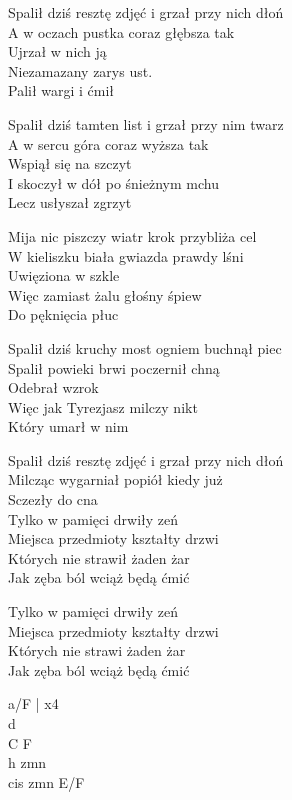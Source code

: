 \begin{text}
    Spalił dziś resztę zdjęć i grzał przy nich dłoń\\
    A w oczach pustka coraz głębsza tak\\
    Ujrzał w nich ją\\
    Niezamazany zarys ust.\\
    Palił wargi i ćmił

    Spalił dziś tamten list i grzał przy nim twarz\\
    A w sercu góra coraz wyższa tak\\
    Wspiął się na szczyt\\
    I skoczył w dół po śnieżnym mchu\\
    Lecz usłyszał zgrzyt

    Mija nic piszczy wiatr krok przybliża cel\\
    W kieliszku biała gwiazda prawdy lśni\\
    Uwięziona w szkle\\
    Więc zamiast żalu głośny śpiew\\
    Do pęknięcia płuc

    Spalił dziś kruchy most ogniem buchnął piec\\
    Spalił powieki brwi poczernił chną\\
    Odebrał wzrok\\
    Więc jak Tyrezjasz milczy nikt\\
    Który umarł w nim

    Spalił dziś resztę zdjęć i grzał przy nich dłoń\\
    Milcząc wygarniał popiół kiedy już\\
    Sczezły do cna\\
    Tylko w pamięci drwiły zeń\\
    Miejsca przedmioty kształty drzwi\\
    Których nie strawił żaden żar\\
    Jak zęba ból wciąż będą ćmić

    Tylko w pamięci drwiły zeń\\
    Miejsca przedmioty kształty drzwi\\
    Których nie strawi żaden żar\\
    Jak zęba ból wciąż będą ćmić
\end{text}
\begin{chord}
    a/F | x4\\
    d\\
    C F\\
    h zmn\\
    cis zmn E/F
\end{chord}